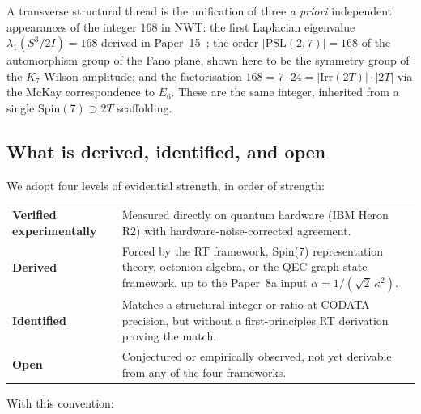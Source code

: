 \documentclass[11pt]{article}
\newcommand{\Spin}{\mathrm{Spin}}
\begin{document}
A transverse structural thread is the unification of three
\emph{a priori} independent appearances of the integer $168$ in
NWT: the first Laplacian eigenvalue $\lambda_1(S^3/2I) = 168$
derived in Paper~15~\cite{paper15}; the order
$|\mathrm{PSL}(2,7)| = 168$ of the automorphism group of the Fano
plane, shown here to be the symmetry group of the $K_7$ Wilson
amplitude; and the factorisation
$168 = 7\cdot 24 = |\mathrm{Irr}(2T)|\cdot |2T|$ via the McKay
correspondence to $E_6$.  These are the same integer, inherited
from a single $\Spin(7) \supset 2T$ scaffolding.

\subsection{What is derived, identified, and open}
\label{sec:intro-status}

We adopt four levels of evidential strength, in order of strength:

\begin{center}
\begin{tabular}{lp{}}
\toprule
\textbf{Verified experimentally} & Measured directly on quantum
  hardware (IBM Heron R2) with hardware-noise-corrected agreement.\\
\textbf{Derived} & Forced by the RT framework, Spin(7)
  representation theory, octonion algebra, or the QEC graph-state
  framework, up to the Paper~8a input
  $\alpha = 1/(\sqrt{2}\,\kappa^2)$. \\
\textbf{Identified} & Matches a structural integer or ratio at
  CODATA precision, but without a first-principles RT derivation
  proving the match. \\
\textbf{Open} & Conjectured or empirically observed, not yet
  derivable from any of the four frameworks.\\
\bottomrule
\end{tabular}
\end{center}

\noindent
With this convention:
\end{document}
